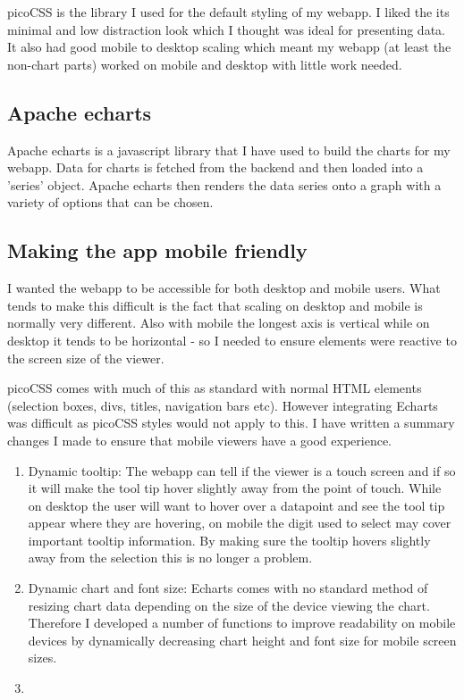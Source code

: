 picoCSS is the library I used for the default styling of my webapp. I liked the
its minimal and low distraction look which I thought was ideal for presenting
data. It also had good mobile to desktop scaling which meant my webapp (at least
the non-chart parts) worked on mobile and desktop with little work needed.

\subsection{Apache echarts}

Apache echarts is a javascript library that I have used to build the charts for
my webapp. Data for charts is fetched from the backend and then loaded into a
'series' object. Apache echarts then renders the data series onto a graph with a
variety of options that can be chosen.


\subsection{Making the app mobile friendly}

I wanted the webapp to be accessible for both desktop and mobile users. What
tends to make this difficult is the fact that scaling on desktop and mobile is
normally very different. Also with mobile the longest axis is vertical while on
desktop it tends to be horizontal - so I needed to ensure elements were reactive
to the screen size of the viewer.

picoCSS comes with much of this as standard with normal HTML elements (selection
boxes, divs, titles, navigation bars etc). However integrating Echarts was
difficult as picoCSS styles would not apply to this. I have written a summary
changes I made to ensure that mobile viewers have a good experience.

\begin{enumerate}
    \item Dynamic tooltip: The webapp can tell if the viewer is a touch screen
          and if so it will make the tool tip hover slightly away from the point
          of touch. While on desktop the user will want to hover over a
          datapoint and see the tool tip appear where they are hovering, on
          mobile the digit used to select may cover important tooltip
          information. By making sure the tooltip hovers slightly away from the
          selection this is no longer a problem.
    \item Dynamic chart and font size: Echarts comes with no standard method of
          resizing chart data depending on the size of the device viewing the
          chart. Therefore I developed a number of functions to improve
          readability on mobile devices by dynamically decreasing chart height
          and font size for mobile screen sizes.
    \item
\end{enumerate}




